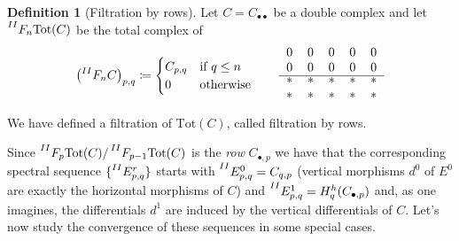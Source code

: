 \documentclass[a4paper]{article}
\newcommand{\tot}{\textrm{Tot}}
\newcommand{\IIi}[1]{\prescript{II}{}{#1}}
\newcommand{\bb}{\bullet\bullet}
\theoremstyle{plain}
\theoremstyle{definition}
\newtheorem{defn}[thm]{Definition}
\begin{document}
		\begin{defn}[Filtration by rows]
			Let $C = C_{\bb}$ be a double complex and let $\IIi{F_n\tot(C)}$ be the total complex of
			\begin{gather*}
				\left(\IIi{F_nC}\right)_{p,q} \coloneqq 
				\begin{cases}
					C_{p,q} & \text{if $q \leq n$}\\
					0 & \text{otherwise}
				\end{cases}\qquad
				\begin{tabular}{c c c c c}
					0 & 0 & 0 & 0 & 0\\
					0 & 0 & 0 & 0 & 0\\ \hline
					* & * & * & * & *\\
					* & * & * & * & *
				\end{tabular}
			\end{gather*}
			We have defined a filtration of $\tot(C)$, called filtration by rows.
		\end{defn}
		Since $\IIi{F_p\tot(C)}/\IIi{F_{p-1}\tot(C)}$ is the \emph{row} $C_{\bullet, p}$ we have that the corresponding spectral sequence $\{\IIi{E^r_{p,q}}\}$ starts with $\IIi{E^0_{p,q}} = C_{q,p}$ (vertical morphisms $d^0$ of $E^0$ are exactly the horizontal morphisms of $C$) and $\IIi{E^1_{p,q}} = H^h_q(C_{\bullet, p})$ and, as one imagines, the differentials $d^1$ are induced by the vertical differentials of $C$.
		Let's now study the convergence of these sequences in some special cases.
\end{document}
